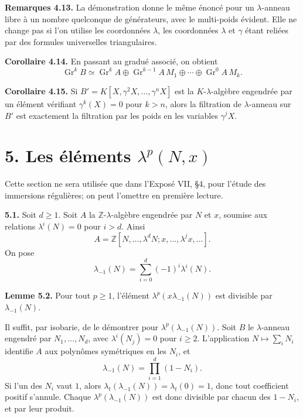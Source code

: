 \documentclass[11pt]{article}
\newcommand{\Gr}{\operatorname{Gr}}
\providecommand{\Gr}{\operatorname{Gr}}
\providecommand{\Gr}{\operatorname{G}}
\begin{document}
\textbf{Remarques 4.13.} La démonstration donne le même énoncé pour un \(\lambda\)-anneau libre à un nombre quelconque de générateurs, avec le multi-poids évident. Elle ne change pas si l'on utilise les coordonnées \(\lambda\), les coordonnées \(\lambda\) et \(\gamma\) étant reliées par des formules universelles triangulaires.

\textbf{Corollaire 4.14.} En passant au gradué associé, on obtient
\begin{equation}\tag{4.14.1}
  \Gr^kB\simeq
  \Gr^kA\oplus \Gr^{k-1}A\,M_1\oplus\cdots\oplus\Gr^0A\,M_k.
\end{equation}

\textbf{Corollaire 4.15.} Si \(B'=K[X,\gamma^2X,\ldots,\gamma^nX]\) est la \(K\)-\(\lambda\)-algèbre engendrée par un élément vérifiant \(\gamma^k(X)=0\) pour \(k>n\), alors la filtration de \(\lambda\)-anneau sur \(B'\) est exactement la filtration par les poids en les variables \(\gamma^jX\).

\section*{5. Les éléments \(\lambda^p(N,x)\)}

Cette section ne sera utilisée que dans l'Exposé VII, §4, pour l'étude des immersions régulières; on peut l'omettre en première lecture.

\textbf{5.1.} Soit \(d\ge1\). Soit \(A\) la \(\mathbb Z\)-\(\lambda\)-algèbre engendrée par \(N\) et \(x\), soumise aux relations \(\lambda^i(N)=0\) pour \(i>d\). Ainsi
\[
  A=\mathbb Z[N,\ldots,\lambda^dN;
       x,\ldots,\lambda^jx,\ldots].
\]
On pose
\begin{equation}\tag{5.1.1}
  \lambda_{-1}(N)=\sum_{i=0}^{d}(-1)^i\lambda^i(N).
\end{equation}

\textbf{Lemme 5.2.} Pour tout \(p\ge1\), l'élément \(\lambda^p(x\lambda_{-1}(N))\) est divisible par \(\lambda_{-1}(N)\).

Il suffit, par isobarie, de le démontrer pour \(\lambda^p(\lambda_{-1}(N))\). Soit \(B\) le \(\lambda\)-anneau engendré par \(N_1,\ldots,N_d\), avec \(\lambda^i(N_j)=0\) pour \(i\ge2\). L'application \(N\mapsto\sum_iN_i\) identifie \(A\) aux polynômes symétriques en les \(N_i\), et
\[
  \lambda_{-1}(N)=\prod_{i=1}^{d}(1-N_i).
\]
Si l'un des \(N_i\) vaut \(1\), alors \(\lambda_t(\lambda_{-1}(N))=\lambda_t(0)=1\), donc tout coefficient positif s'annule. Chaque \(\lambda^p(\lambda_{-1}(N))\) est donc divisible par chacun des \(1-N_i\), et par leur produit.
\end{document}
